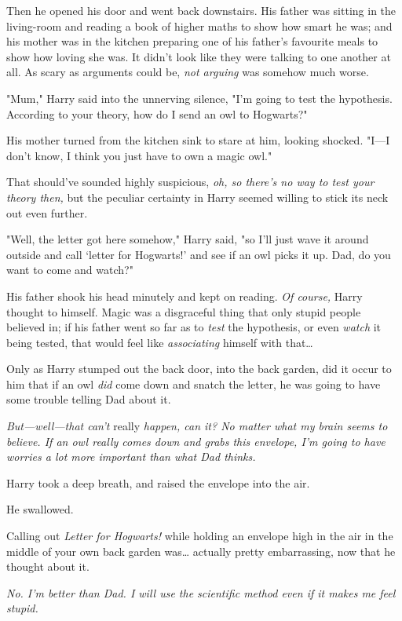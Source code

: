 Then he opened his door and went back downstairs. His father was sitting in the
living-room and reading a book of higher maths to show how smart he was; and
his mother was in the kitchen preparing one of his father's favourite meals to
show how loving she was. It didn't look like they were talking to one another
at all. As scary as arguments could be, \emph{not arguing} was somehow much
worse.

"Mum," Harry said into the unnerving silence, "I'm going to test the
hypothesis. According to your theory, how do I send an owl to Hogwarts?"

His mother turned from the kitchen sink to stare at him, looking shocked.
"I---I don't know, I think you just have to own a magic owl."

That should've sounded highly suspicious, \emph{oh, so there's no way to test
your theory then,} but the peculiar certainty in Harry seemed willing to stick
its neck out even further.

"Well, the letter got here somehow," Harry said, "so I'll just wave it around
outside and call `letter for Hogwarts!' and see if an owl picks it up. Dad, do
you want to come and watch?"

His father shook his head minutely and kept on reading. \emph{Of course,} Harry
thought to himself. Magic was a disgraceful thing that only stupid people
believed in; if his father went so far as to \emph{test} the hypothesis, or
even \emph{watch} it being tested, that would feel like \emph{associating}
himself with that{\ldots}

Only as Harry stumped out the back door, into the back garden, did it occur to
him that if an owl \emph{did} come down and snatch the letter, he was going to
have some trouble telling Dad about it.

\emph{But---well---that can't} really \emph{happen, can it? No matter what my
brain seems to believe. If an owl really comes down and grabs this envelope,
I'm going to have worries a lot more important than what Dad thinks.}

Harry took a deep breath, and raised the envelope into the air.

He swallowed.

Calling out \emph{Letter for Hogwarts!} while holding an envelope high in the
air in the middle of your own back garden was{\ldots} actually pretty
embarrassing, now that he thought about it.

\emph{No. I'm better than Dad. I will use the scientific method even if it
makes me feel stupid.}

